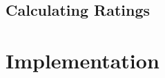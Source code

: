 \documentclass[12pt]{article}
\begin{document}
  \subsection{Calculating Ratings}
  \indent\indent 


  \pagebreak
  \section{Implementation}

 
\end{document}
